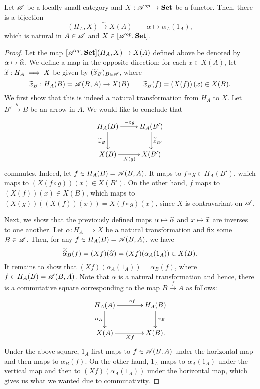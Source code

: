 \begin{theorem}
    Let $\mathscr A$ be a locally small category and $X: \mathscr A^{op}\to\mathbf{Set}$ be a functor. Then, there is a bijection
    \begin{equation*}
        [\scrA^{op},\catSet](H_A, X)\xrightarrow{\sim} X(A)\qquad\alpha\mapsto\alpha_A(1_A),
    \end{equation*}
    which is natural in $A\in\mathscr A$ and $X\in[\mathscr A^{op}, \mathbf{Set}]$.
\end{theorem}
\begin{proof}
    Let the map $[\mathscr A^{op},\mathbf{Set}](H_A, X)\to X(A)$ defined above be denoted by $\alpha\mapsto\widehat{\alpha}$. We define a map in the opposite direction: for each $x\in X(A)$, let $\widetilde{x}: H_A\implies X$ be given by $(\widetilde{x}_B)_{B\in\mathscr A}$, where 
    \begin{equation*}
        \widetilde{x}_B: H_A(B) = \mathscr A(B, A)\to X(B)\qquad \widetilde{x}_B(f) = \left(X(f)\right)(x)\in X(B).
    \end{equation*}
    We first show that this is indeed a natural transformation from $H_A$ to $X$. Let $B'\xrightarrow{g} B$ be an arrow in $A$. We would like to conclude that 
    \begin{equation*}
        \xymatrix {
            H_A(B)\ar[r]^{-\circ g}\ar[d]_{\wt x_B} & H_A(B')\ar[d]^{\wt x_{B'}}\\
            X(B)\ar[r]_{X(g)} & X(B')
        }
    \end{equation*}
    commutes. Indeed, let $f\in H_A(B) = \mathscr A(B, A)$. It maps to $f\circ g\in H_A(B')$, which maps to $(X(f\circ g))(x)\in X(B')$. On the other hand, $f$ maps to $(X(f))(x)\in X(B)$, which maps to $(X(g))((X(f))(x)) = X(f\circ g)(x)$, since $X$ is contravariant on $\mathscr A$.

    Next, we show that the previously defined maps $\alpha\mapsto\widehat{\alpha}$ and $x\mapsto\widetilde{x}$ are inverses to one another. Let $\alpha: H_A\implies X$ be a natural transformation and fix some $B\in\mathscr A$. Then, for any $f\in H_A(B) = \mathscr A(B, A)$, we have 
    \begin{equation*}
        \widetilde{\widehat{\alpha}}_B(f) = (Xf)(\widehat{\alpha}) = (Xf)(\alpha_A(1_A))\in X(B).
    \end{equation*}
    It remains to show that $(Xf)(\alpha_A(1_A)) = \alpha_B(f)$, where $f\in H_A(B) = \mathscr A(B, A)$. Note that $\alpha$ is a natural transformation and hence, there is a commutative square corresponding to the map $B\xrightarrow{f} A$ as follows: 
    \begin{equation*}
        \xymatrix@C+1pc {
            H_A(A)\ar[r]^{-\circ f}\ar[d]_{\alpha_A} & H_A(B)\ar[d]^{\alpha_B}\\
            X(A)\ar[r]_{Xf} & X(B).
        }
    \end{equation*}
    Under the above square, $1_A$ first maps to $f\in\mathscr A(B, A)$ under the horizontal map and then maps to $\alpha_B(f)$. On the other hand, $1_A$ maps to $\alpha_A(1_A)$ under the vertical map and then to $(Xf)(\alpha_A(1_A))$ under the horizontal map, which gives us what we wanted due to commutativity. 


\end{proof}
